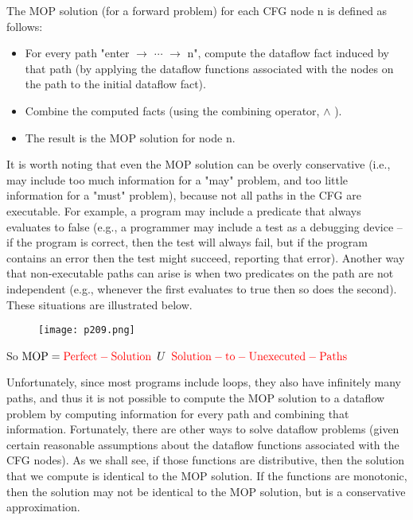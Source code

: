 The MOP solution (for a forward problem) for each CFG node n is defined as follows:


\begin{itemize}
	\item For every path "enter $\rightarrow$  $\cdots$  $\rightarrow$ n", compute the dataflow fact induced by that path
	      (by applying the dataflow functions associated with the nodes on the path to the initial dataflow fact).
	\item Combine the computed facts (using the combining operator, $\wedge $ ).
	\item The result is the MOP solution for node n.

\end{itemize}


It is worth noting that even the MOP solution can be overly conservative
(i.e., may include too much information for a "may" problem, and too little information for a "must" problem),
because not all paths in the CFG are executable. For example, a program may include a predicate that always evaluates to false
(e.g., a programmer may include a test as a debugging device -- if the program is correct, then the test will always fail,
but if the program contains an error then the test might succeed, reporting that error). Another way that non-executable paths
can arise is when two predicates on the path are not independent (e.g., whenever the first evaluates to true then so does the second).
These situations are illustrated below.



\begin{figure}[H]
	\centering
	\texttt{[image: p209.png]}
	\caption{}
	\label{fig:p209}
\end{figure}




So $\mathrm{MOP} = {\color{red}\mathrm{Perfect-Solution   }} \,\,\,U\,\,\, {\color{red}\mathrm{   Solution-to-Unexecuted-Paths}}$

Unfortunately, since most programs include loops, they also have infinitely many paths, and thus it is not possible to
compute the MOP solution to a dataflow problem by computing information for every path and combining that information. Fortunately,
there are other ways to solve dataflow problems (given certain reasonable assumptions about the dataflow functions associated with
the CFG nodes). As we shall see, if those functions are distributive, then the solution that we compute is identical to the MOP
solution. If the functions are monotonic, then the solution may not be identical to the MOP solution, but is a conservative
approximation.

